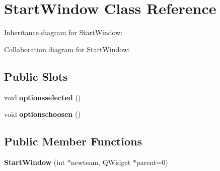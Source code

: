 \hypertarget{classStartWindow}{}\section{Start\+Window Class Reference}
\label{classStartWindow}


Inheritance diagram for Start\+Window\+:


Collaboration diagram for Start\+Window\+:
\subsection*{Public Slots}
\begin{DoxyCompactItemize}
\item 
void {\bfseries optionsselected} ()\hypertarget{classStartWindow_a20754738e39c176ab45988d948ff2caa}{}\label{classStartWindow_a20754738e39c176ab45988d948ff2caa}

\item 
void {\bfseries optionschoosen} ()\hypertarget{classStartWindow_a7af4f280c68963bf96c3dca115a2a0ac}{}\label{classStartWindow_a7af4f280c68963bf96c3dca115a2a0ac}

\end{DoxyCompactItemize}
\subsection*{Public Member Functions}
\begin{DoxyCompactItemize}
\item 
{\bfseries Start\+Window} (int $\ast$newteam, Q\+Widget $\ast$parent=0)\hypertarget{classStartWindow_a4637d36b26504d40f19cb0873543f280}{}\label{classStartWindow_a4637d36b26504d40f19cb0873543f280}

\end{DoxyCompactItemize}
